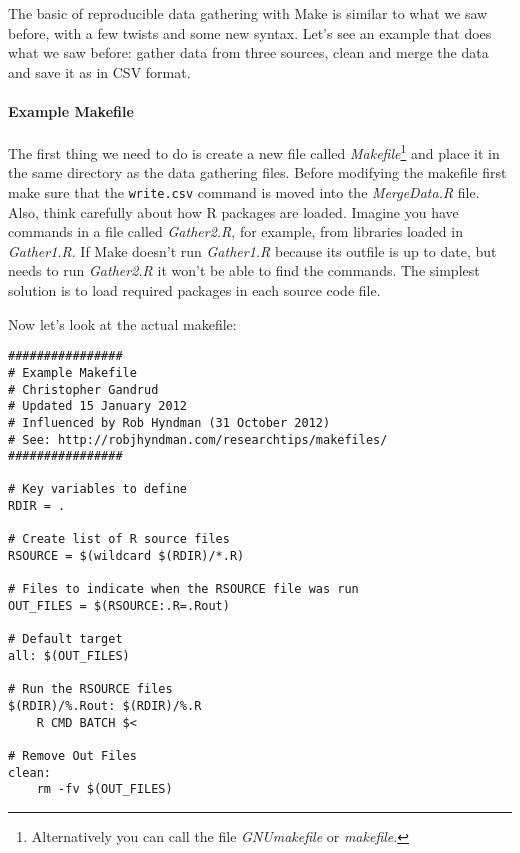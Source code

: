 The basic of reproducible data gathering with Make is similar to what we saw before, with a few twists and some new syntax. Let's see an example that does what we saw before: gather data from three sources, clean and merge the data and save it as in CSV format. 

\paragraph{Example Makefile}

The first thing we need to do is create a new file called \emph{Makefile}\footnote{Alternatively you can call the file \emph{GNUmakefile} or \emph{makefile}.} and place it in the same directory as the data gathering files. Before modifying the makefile first make sure that the \texttt{write.csv} command is moved into the \emph{MergeData.R} file. Also, think carefully about how R packages are loaded. Imagine you have commands in a file called \emph{Gather2.R}, for example, from libraries loaded in \emph{Gather1.R}. If Make doesn't run \emph{Gather1.R} because its outfile is up to date, but needs to run \emph{Gather2.R} it won't be able to find the commands. The simplest solution is to load required packages in each source code file.

Now let's look at the actual makefile:

\begin{knitrout}
	\color{fgcolor}
	\begin{kframe}
		\begin{verbatim}
################
# Example Makefile
# Christopher Gandrud
# Updated 15 January 2012
# Influenced by Rob Hyndman (31 October 2012)
# See: http://robjhyndman.com/researchtips/makefiles/
################

# Key variables to define
RDIR = .

# Create list of R source files
RSOURCE = $(wildcard $(RDIR)/*.R)

# Files to indicate when the RSOURCE file was run
OUT_FILES = $(RSOURCE:.R=.Rout)

# Default target
all: $(OUT_FILES) 

# Run the RSOURCE files
$(RDIR)/%.Rout: $(RDIR)/%.R
    R CMD BATCH $<

# Remove Out Files
clean: 
    rm -fv $(OUT_FILES)
		\end{verbatim}
	\end{kframe}
\end{knitrout}

